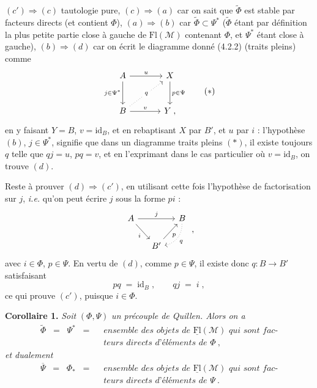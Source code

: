 \documentclass[11pt]{article}
\newcommand{\printedpage}[1]{\marginpar{\footnotesize p.~#1}}
\newcommand{\msp}[1]{\marginpar{\footnotesize [#1]}}
\newcommand{\Fl}{\mathrm{Fl}}
\newcommand{\id}{\mathrm{id}}
\begin{document}
$(c')\Longrightarrow(c)$ tautologie pure, $(c)\Longrightarrow(a)$ car on sait que $\widetilde{\Phi}$ est stable par facteurs directs (et contient $\Phi$), $(a)\Longrightarrow(b)$ car $\widetilde{\Phi}\subset\Psi^*$ ($\widetilde{\Phi}$ étant par définition la plus petite partie close à gauche de $\Fl(\mathcal{M})$ contenant $\Phi$, et $\Psi^*$ étant close à gauche), $(b)\Longrightarrow(d)$ car on écrit le diagramme donné (4.2.2) (traits pleins) comme %
\[
\begin{tikzcd}[row sep=large, column sep=large]
A \arrow[r, "u"] \arrow[d, "j\in\Psi^*"'] & X \arrow[d, "p\in\Psi"] \\
B \arrow[ur, dotted, "q" description] \arrow[r, "v"] & Y \;,
\end{tikzcd}
\tag*{$(*)$}
\]
en y faisant $Y=B$, $v=\id_B$, et en rebaptisant $X$ par $B'$, et $u$ par $i$ : l'hypothèse $(b)$, $j\in\Psi^*$, signifie que dans un diagramme traits pleins $(*)$, il existe toujours $q$ telle que $qj=u$, $pq=v$, et en l'exprimant dans le cas particulier où $v=\id_B$, on trouve $(d)$.

Reste à prouver $(d)\Longrightarrow(c')$, en utilisant cette fois l'hypothèse de factorisation sur $j$, \textit{i.e.} qu'on peut écrire $j$ sous la forme $pi$ :
\[
\begin{tikzcd}[column sep=small]
A \arrow[rr, "j"] \arrow[dr, "i"'] & & B \arrow[dl, dotted, bend left=40, "q"] \\
& B' \arrow[ur, "p"'] &
\end{tikzcd}
\;,
\]
avec $i\in\Phi$, $p\in\Psi$. En vertu de $(d)$, comme $p\in\Psi$, il existe donc $q:B\longrightarrow B'$ satisfaisant
\printedpage{21}
\msp{page 31}
\[
pq \;=\; \id_B\;, \qquad qj \;=\; i\;,
\]
ce qui prouve $(c')$, puisque $i\in\Phi$.

\textbf{Corollaire 1.} \textit{Soit} $(\Phi,\Psi)$ \textit{un précouple de Quillen. Alors on a}
\[
\begin{aligned}
\widetilde{\Phi} \;\;=\;\; \Psi^* \;\;=\;\; &\textit{ensemble des objets de } \underline{\Fl}(\mathcal{M}) \textit{ qui sont fac-}\\
&\textit{teurs directs d'éléments de } \Phi\ ,
\end{aligned}
\tag*{(4.3)}
\] %
\textit{et dualement}
\[
\begin{aligned}
\overline{\Psi} \;\;=\;\; \Phi_* \;\;=\;\; &\textit{ensemble des objets de } \underline{\Fl}(\mathcal{M}) \textit{ qui sont fac-}\\
&\textit{teurs directs d'éléments de } \Psi\ .
\end{aligned}
\tag*{(4.4)}
\] %
\end{document}
